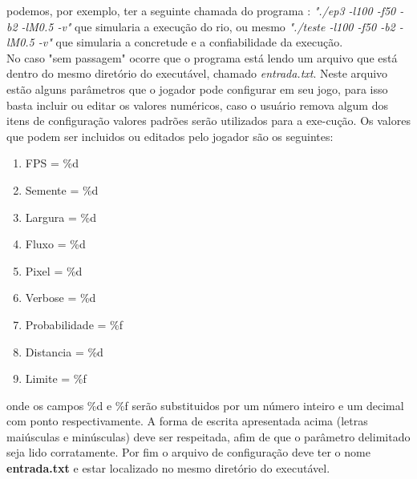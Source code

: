\documentclass[a4paper,11pt]{article}
\begin{document}
podemos, por exemplo, ter a seguinte chamada do programa : \textit{"./ep3 -l100 -f50 -b2 -lM0.5 -v"} que simularia a execu\c{c}ão do rio, ou mesmo \textit{"./teste -l100 -f50 -b2 -lM0.5 -v"} que simularia a concretude e a confiabilidade da execu\c{c}ão.\\
No caso "sem passagem" ocorre que o programa está lendo um arquivo que está dentro do mesmo diretório do executável, chamado \textit{entrada.txt}. Neste arquivo estão alguns parâmetros que o jogador pode configurar em seu jogo, para isso basta incluir ou  editar os valores numéricos, caso o usuário remova algum dos itens de configura\c{c}ão valores padrões serão utilizados para a exe-cu\c{c}ão. Os valores que podem ser incluidos ou editados pelo jogador são os seguintes: 

\begin{enumerate}
\item[]{FPS = \%d}
\item[]{Semente = \%d}
\item[]{Largura = \%d}
\item[]{Fluxo = \%d}
\item[]{Pixel = \%d}
\item[]{Verbose = \%d}
\item[]{Probabilidade = \%f}
\item[]{Distancia = \%d}
\item[]{Limite = \%f}
\end{enumerate}
onde os campos \%d e \%f serão substituidos por um número inteiro e um decimal com ponto respectivamente. A forma de escrita apresentada acima (letras maiúsculas e minúsculas) deve ser respeitada, afim de que o parâmetro delimitado seja lido corratamente. Por fim o arquivo de configura\c{c}ão deve ter o nome \textbf{entrada.txt} e estar localizado no mesmo diretório do executável.
\end{document}
